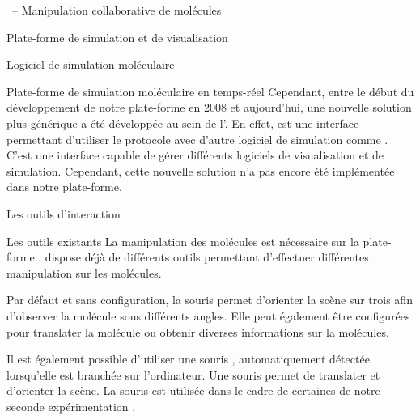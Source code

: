 \documentclass[myfrancais]{mythesis}
\begin{document}
\begin{mychapter}{\myShaddock\ -- Manipulation collaborative de molécules}
\begin{mysection}{Plate-forme de simulation et de visualisation}
\begin{mysubsection}{Logiciel de simulation moléculaire}
\begin{mysubsubsection}{Plate-forme de simulation moléculaire en temps-réel}
					Cependant, entre le début du développement de notre plate-forme en 2008 et aujourd'hui, une nouvelle solution plus générique a été développée au sein de l'.
					En effet, \myMDDriver {} est une interface permettant d'utiliser le protocole  avec d'autre logiciel de simulation comme \myGromacs.
					C'est une interface capable de gérer différents logiciels de visualisation et de simulation.
					Cependant, cette nouvelle solution n'a pas encore été implémentée dans notre plate-forme.
				\end{mysubsubsection}
			\end{mysubsection}
		\end{mysection}
		\begin{mysection}{Les outils d'interaction}
			\begin{mysubsection}{Les outils existants}
				La manipulation des molécules est nécessaire sur la plate-forme \myShaddock.
				 dispose déjà de différents outils permettant d'effectuer différentes manipulation sur les molécules.

				Par défaut et sans configuration, la souris permet d'orienter la scène sur trois  afin d'observer la molécule sous différents angles.
				Elle peut également être configurées pour translater la molécule ou obtenir diverses informations sur la molécules.

				Il est également possible d'utiliser une souris \myThreeD, automatiquement détectée lorsqu'elle est branchée sur l'ordinateur.
				Une souris \myThreeD permet de translater et d'orienter la scène.
				La souris \myThreeD \mySpaceNavigator est utilisée dans le cadre de certaines de notre seconde expérimentation .


\end{mysubsection}
\end{mysection}
\end{mychapter}
\end{document}
